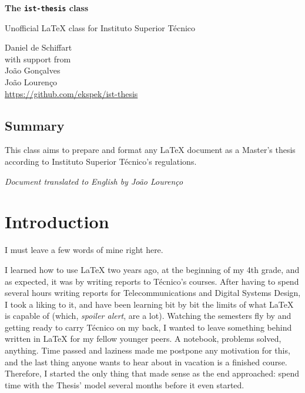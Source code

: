 \documentclass[english]{ist-thesis}
\begin{document}
\begin{center}
	{\Huge\bfseries The \texttt{ist-thesis} class}
	\par\bigskip
	{\Large Unofficial \LaTeX{} class for Instituto Superior Técnico}
	\par\bigskip\smallskip
	Daniel de Schiffart \\
	{\small with support from} \\
	João Gonçalves \\
	João Lourenço \bigskip \\
	\url{https://github.com/ekspek/ist-thesis} \bigskip \\
\end{center}

\bigskip\bigskip

\begin{center}
	\section*{Summary}
\end{center}
This class aims to prepare and format any \LaTeX{} document as a Master's thesis according to Instituto Superior Técnico's regulations.

\vspace{\fill}
\begin{center}
    \textit{Document translated to English by João Lourenço}
\end{center}

\tableofcontents

\clearpage

\section*{Introduction}

I must leave a few words of mine right here.

I learned how to use \LaTeX{} two years ago, at the beginning of my 4th grade, and as expected, it was by writing reports to Técnico's courses. After having to spend several hours writing reports for Telecommunications and Digital Systems Design, I took a liking to it, and have been learning bit by bit the limits of what \LaTeX{} is capable of (which, \textit{spoiler alert}, are a lot). Watching the semesters fly by and getting ready to carry Técnico on my back, I wanted to leave something behind written in \LaTeX{} for my fellow younger peers. A notebook, problems solved, anything. Time passed and laziness made me postpone any motivation for this, and the last thing anyone wants to hear about in vacation is a finished course. Therefore, I started the only thing that made sense as the end approached: spend time with the Thesis' model several months before it even started.
\end{document}
